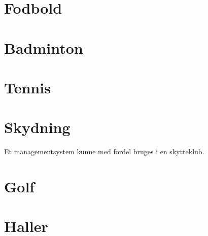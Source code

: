 \section{Fodbold}



\section{Badminton}

\section{Tennis}

\section{Skydning}
Et managementsystem kunne med fordel bruges i en skytteklub. 

\section{Golf}

\section{Haller}